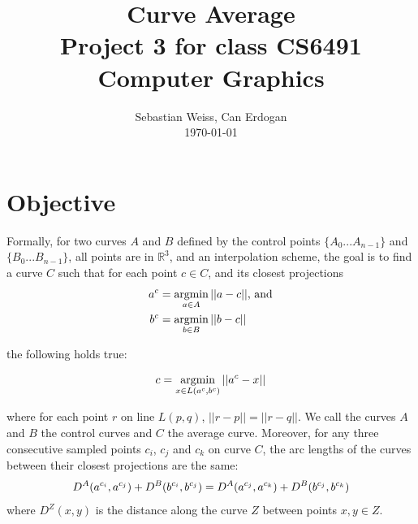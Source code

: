\documentclass[journal, letterpaper]{IEEEtran}
\begin{document}
\title{Curve Average \\
	{\large Project 3 for class CS6491 Computer Graphics}}
\author{Sebastian Weiss, Can Erdogan \\ \today}

\maketitle


\section{Objective}
Formally, for two curves $A$ and $B$ defined by the control points $\{A_0 ... A_{n-1}\}$ and $\{B_0 ... B_{n-1}\}$, all points are in $\mathbb{R}^3$, and an interpolation scheme,
the goal is to find a curve $C$ such that for each point $c \in C$, and its closest projections
\begin{align}
a^c &= \operatornamewithlimits{argmin}\limits_{a \in A} ||a-c|| \text{, and} \\
b^c &= \operatornamewithlimits{argmin}\limits_{b \in B} ||b-c||
\end{align}

\noindent the following holds true:

\begin{equation}
 c = \operatornamewithlimits{argmin}\limits_{x \in L(a^c, b^c)} ||a^c-x||
\end{equation}

\noindent where for each point $r$ on line $L(p,q)$, $||r-p|| = ||r-q||$. We call the curves $A$ and $B$ the control curves and $C$ the average curve.
Moreover, for any three consecutive sampled points $c_i$, $c_j$ and $c_k$ on curve $C$, the arc lengths
of the curves between their closest projections are the same:
\begin{equation}
\small
 D^A(a^{c_i},a^{c_j}) + D^B(b^{c_i},b^{c_j}) = D^A(a^{c_j},a^{c_k}) + D^B(b^{c_j},b^{c_k})
\end{equation}
\noindent where $D^Z(x,y)$ is the distance along the curve $Z$ between points $x,y \in Z$.
\end{document}
